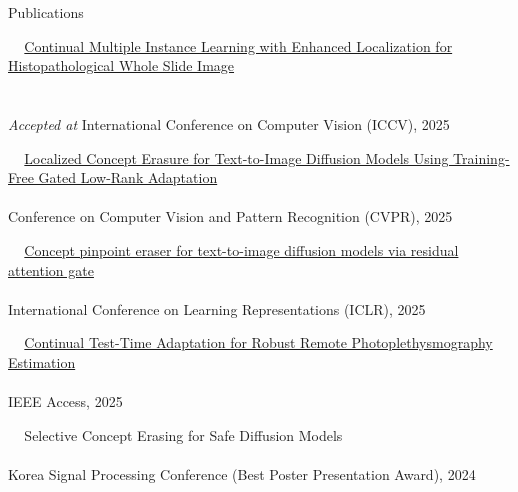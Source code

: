 \documentclass{resume} %
\newcommand{\mycolor}[1]{\textcolor{myurlcolor}{#1}}
\begin{document}
\begin{rSection}{Publications}

\textbullet~\,\, \href{https://arxiv.org/pdf/2507.02395}{Continual Multiple Instance Learning with Enhanced Localization for Histopathological Whole Slide Image \\ \hspace*{1.5em}{Analysis}} 
\\ 
\\ \hspace*{1.5em} \textit{Accepted at} International Conference on Computer Vision (ICCV), 2025



\textbullet~\,\, \href{https://arxiv.org/abs/2503.12356}{Localized Concept Erasure for Text-to-Image Diffusion Models Using Training-Free Gated Low-Rank Adaptation}
\\ 
\\ \hspace*{1.5em}Conference on Computer Vision and Pattern Recognition (CVPR), 2025


\textbullet~\,\, \href{https://arxiv.org/abs/2312.13027}{Concept pinpoint eraser for text-to-image diffusion models via residual attention gate}
\\ 
\\ \hspace*{1.5em}International Conference on Learning Representations (ICLR), 2025



\textbullet~\,\, \href{https://ieeexplore.ieee.org/document/10938539}{Continual Test-Time Adaptation for Robust Remote Photoplethysmography Estimation}
\\ 
\\ \hspace*{1.5em}IEEE Access, 2025



\textbullet~\,\, {\mycolor{Selective Concept Erasing for Safe Diffusion Models}}
\\ 
\\ \hspace*{1.5em}Korea Signal Processing Conference (Best Poster Presentation Award), 2024


\end{rSection}
\end{document}
